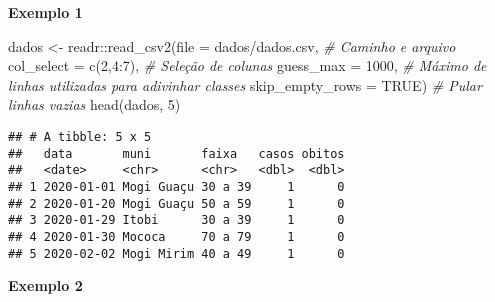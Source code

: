 \documentclass[
]{book}
\newenvironment{Shaded}{\begin{snugshade}}{\end{snugshade}}
\newcommand{\AttributeTok}[1]{\textcolor[rgb]{0.77,0.63,0.00}{#1}}
\newcommand{\CommentTok}[1]{\textcolor[rgb]{0.56,0.35,0.01}{\textit{#1}}}
\newcommand{\ConstantTok}[1]{\textcolor[rgb]{0.00,0.00,0.00}{#1}}
\newcommand{\DecValTok}[1]{\textcolor[rgb]{0.00,0.00,0.81}{#1}}
\newcommand{\FunctionTok}[1]{\textcolor[rgb]{0.00,0.00,0.00}{#1}}
\newcommand{\NormalTok}[1]{#1}
\newcommand{\OtherTok}[1]{\textcolor[rgb]{0.56,0.35,0.01}{#1}}
\newcommand{\SpecialCharTok}[1]{\textcolor[rgb]{0.00,0.00,0.00}{#1}}
\newcommand{\StringTok}[1]{\textcolor[rgb]{0.31,0.60,0.02}{#1}}
\theoremstyle{definition}
\theoremstyle{definition}
\theoremstyle{definition}
\theoremstyle{definition}
\theoremstyle{remark}
\begin{document}
\textbf{Exemplo 1}

\begin{Shaded}
\begin{Highlighting}[]
\NormalTok{dados }\OtherTok{\textless{}{-}}\NormalTok{ readr}\SpecialCharTok{::}\FunctionTok{read\_csv2}\NormalTok{(}\AttributeTok{file =} \StringTok{\textquotesingle{}dados/dados.csv\textquotesingle{}}\NormalTok{,  }\CommentTok{\# Caminho e arquivo}
                          \AttributeTok{col\_select =} \FunctionTok{c}\NormalTok{(}\DecValTok{2}\NormalTok{,}\DecValTok{4}\SpecialCharTok{:}\DecValTok{7}\NormalTok{),     }\CommentTok{\# Seleção de colunas}
                          \AttributeTok{guess\_max =} \DecValTok{1000}\NormalTok{,          }\CommentTok{\# Máximo de linhas utilizadas para adivinhar classes}
                          \AttributeTok{skip\_empty\_rows =} \ConstantTok{TRUE}\NormalTok{)    }\CommentTok{\# Pular linhas vazias}
\FunctionTok{head}\NormalTok{(dados, }\DecValTok{5}\NormalTok{)                                       }
\end{Highlighting}
\end{Shaded}

\begin{verbatim}
## # A tibble: 5 x 5
##   data       muni       faixa   casos obitos
##   <date>     <chr>      <chr>   <dbl>  <dbl>
## 1 2020-01-01 Mogi Guaçu 30 a 39     1      0
## 2 2020-01-20 Mogi Guaçu 50 a 59     1      0
## 3 2020-01-29 Itobi      30 a 39     1      0
## 4 2020-01-30 Mococa     70 a 79     1      0
## 5 2020-02-02 Mogi Mirim 40 a 49     1      0
\end{verbatim}

\textbf{Exemplo 2}
\end{document}
